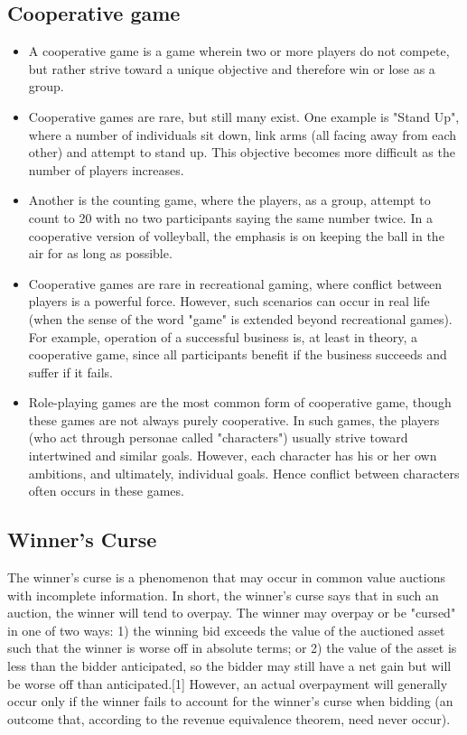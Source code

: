 \documentclass[]{report}
\begin{document}
\newpage
\subsection{Cooperative game}
\begin{itemize}
	\item A cooperative game is a game wherein two or more players do not compete, but rather strive toward a unique objective and therefore win or lose as a group.
	
	\item 	Cooperative games are rare, but still many exist. One example is "Stand Up", where a number of individuals sit down, link arms (all facing away from each other) and attempt to stand up. This objective becomes more difficult as the number of players increases.
	
	\item 	Another is the counting game, where the players, as a group, attempt to count to 20 with no two participants saying the same number twice. In a cooperative version of volleyball, the emphasis is on keeping the ball in the air for as long as possible.
	
	\item 	Cooperative games are rare in recreational gaming, where conflict between players is a powerful force. However, such scenarios can occur in real life (when the sense of the word "game" is extended beyond recreational games). For example, operation of a successful business is, at least in theory, a cooperative game, since all participants benefit if the business succeeds and suffer if it fails.
	
	\item 	Role-playing games are the most common form of cooperative game, though these games are not always purely cooperative. In such games, the players (who act through personae called "characters") usually strive toward intertwined and similar goals. However, each character has his or her own ambitions, and ultimately, individual goals. Hence conflict between characters often occurs in these games.
\end{itemize}
\subsection{Winner's Curse}
The winner's curse is a phenomenon that may occur in common value auctions with incomplete information. In short, the winner's curse says that in such an auction, the winner will tend to overpay. The winner may overpay or be "cursed" in one of two ways: 1) the winning bid exceeds the value of the auctioned asset such that the winner is worse off in absolute terms; or 2) the value of the asset is less than the bidder anticipated, so the bidder may still have a net gain but will be worse off than anticipated.[1] However, an actual overpayment will generally occur only if the winner fails to account for the winner's curse when bidding (an outcome that, according to the revenue equivalence theorem, need never occur).
\end{document}
